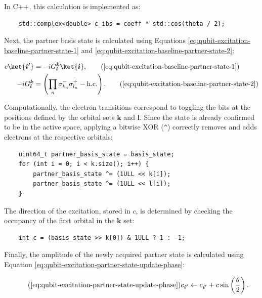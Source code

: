 In C++, this calculation is implemented as:

\begin{verbatim}
    std::complex<double> c_ibs = coeff * std::cos(theta / 2);
\end{verbatim}

Next, the partner basis state is calculated using Equations \eqref{eq:qubit-excitation-baseline-partner-state-1} and \eqref{eq:qubit-excitation-baseline-partner-state-2}:

\begin{align}
    c \ket{\boldsymbol{i'}} &= -iG^{\boldsymbol{k}}_{\boldsymbol{l}} \ket{\boldsymbol{i}}, \tag{\eqref{eq:qubit-excitation-baseline-partner-state-1}} \\
    -iG^{\boldsymbol{k}}_{\boldsymbol{l}} &= \left( \prod_n \sigma^-_{k_n} \sigma^+_{l_n} - \text{h.c.} \right). \tag{\eqref{eq:qubit-excitation-baseline-partner-state-2}}
\end{align}

Computationally, the electron transitions correspond to toggling the bits at the positions defined by the orbital sets $\boldsymbol{k}$ and $\boldsymbol{l}$. Since the state is already confirmed to be in the active space, applying a bitwise XOR (\texttt{\^{}}) correctly removes and adds electrons at the respective orbitals:

\begin{verbatim}
    uint64_t partner_basis_state = basis_state;
    for (int i = 0; i < k.size(); i++) {
        partner_basis_state ^= (1ULL << k[i]);
        partner_basis_state ^= (1ULL << l[i]);
    }
\end{verbatim}

The direction of the excitation, stored in $c$, is determined by checking the occupancy of the first orbital in the $\boldsymbol{k}$ set:

\begin{verbatim}
    int c = (basis_state >> k[0]) & 1ULL ? 1 : -1;
\end{verbatim}

Finally, the amplitude of the newly acquired partner state is calculated using Equation \eqref{eq:qubit-excitation-partner-state-update-phase}:

\begin{equation} \tag{\ref{eq:qubit-excitation-partner-state-update-phase}}
    c_{\boldsymbol{i'}} \leftarrow c_{\boldsymbol{i'}} + c \sin\left(\frac{\theta}{2}\right).
\end{equation}


